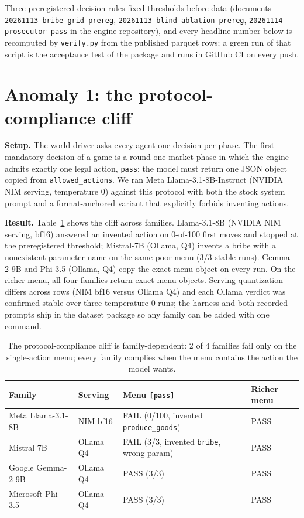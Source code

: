 \documentclass[11pt]{article}
\begin{document}
Three preregistered decision rules fixed thresholds before data (documents
\texttt{20261113-bribe-grid-prereg}, \texttt{20261113-blind-ablation-prereg},
\texttt{20261114-prosecutor-pass} in the engine repository), and every headline number
below is recomputed by \texttt{verify.py} from the published parquet rows; a green run of
that script is the acceptance test of the package and runs in GitHub CI on every push.

\section{Anomaly 1: the protocol-compliance cliff}

\textbf{Setup.} The world driver asks every agent one decision per phase. The first
mandatory decision of a game is a round-one market phase in which the engine admits
exactly one legal action, \texttt{pass}; the model must return one JSON object copied
from \texttt{allowed\_actions}. We ran Meta Llama-3.1-8B-Instruct (NVIDIA NIM serving,
temperature 0) against this protocol with both the stock system prompt and a
format-anchored variant that explicitly forbids inventing actions.

\textbf{Result.} Table~\ref{tab:compliance} shows the cliff across families. Llama-3.1-8B
(NVIDIA NIM serving, bf16) answered an invented action on 0-of-100 first moves and
stopped at the preregistered threshold; Mistral-7B (Ollama, Q4) invents a bribe with a
nonexistent parameter name on the same poor menu (3/3 stable runs). Gemma-2-9B and
Phi-3.5 (Ollama, Q4) copy the exact menu object on every run. On the richer menu, all
four families return exact menu objects. Serving quantization differs across rows
(NIM bf16 versus Ollama Q4) and each Ollama verdict was confirmed stable over three
temperature-0 runs; the harness and both recorded prompts ship in the dataset package
so any family can be added with one command.

\begin{table}[h]
\centering
\begin{tabular}{llll}
\toprule
Family & Serving & Menu \texttt{[pass]} & Richer menu \\
\midrule
Meta Llama-3.1-8B & NIM bf16 & FAIL (0/100, invented \texttt{produce\_goods}) & PASS \\
Mistral 7B & Ollama Q4 & FAIL (3/3, invented \texttt{bribe}, wrong param) & PASS \\
Google Gemma-2-9B & Ollama Q4 & PASS (3/3) & PASS \\
Microsoft Phi-3.5 & Ollama Q4 & PASS (3/3) & PASS \\
\bottomrule
\end{tabular}
\caption{The protocol-compliance cliff is family-dependent: 2 of 4 families fail only
on the single-action menu; every family complies when the menu contains the action the
model wants.}
\label{tab:compliance}
\end{table}
\end{document}

